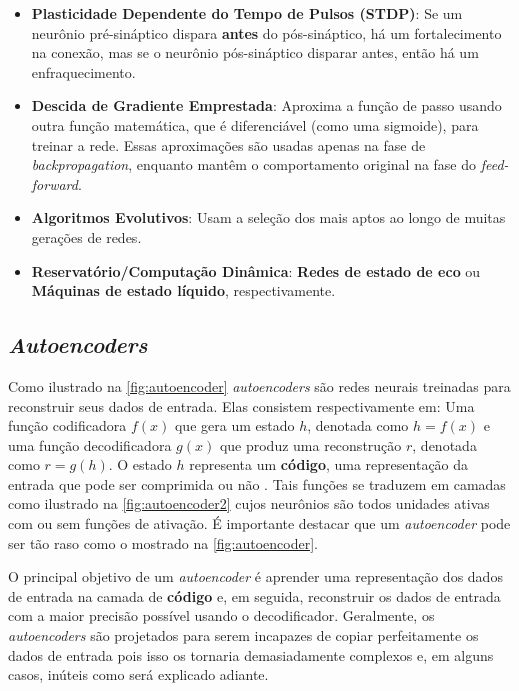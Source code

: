 			\begin{itemize}
				\item \textbf{Plasticidade Dependente do Tempo de Pulsos (STDP)}: Se um neurônio pré-sináptico dispara \textbf{antes} do pós-sináptico, há um fortalecimento na conexão, mas se o neurônio pós-sináptico disparar antes, então há um enfraquecimento.
				\item \textbf{Descida de Gradiente Emprestada}: Aproxima a função de passo usando outra função matemática, que é diferenciável (como uma sigmoide), para treinar a rede. Essas aproximações são usadas apenas na fase de \textit{backpropagation}, enquanto mantêm o comportamento original na fase do \textit{feed-forward}.
				\item \textbf{Algoritmos Evolutivos}: Usam a seleção dos mais aptos ao longo de muitas gerações de redes.
				\item \textbf{Reservatório/Computação Dinâmica}: \textbf{Redes de estado de eco} ou \textbf{Máquinas de estado líquido}, respectivamente.
			\end{itemize}
		
		\subsection{\textit{Autoencoders}}
		
			\par Como ilustrado na  \autoref{fig:autoencoder} \textit{autoencoders} são redes neurais treinadas para reconstruir seus dados de entrada. Elas consistem respectivamente em: Uma função codificadora $f(x)$ que gera um estado $h$, denotada como $h = f(x)$ e uma função decodificadora $g(x)$ que produz uma reconstrução $r$, denotada como $r = g(h)$. O estado $h$ representa um \textbf{código}, uma representação da entrada que pode ser comprimida ou não  \cite{Goodfellow-et-al-2016}. Tais funções se traduzem em camadas como ilustrado na  \autoref{fig:autoencoder2} cujos neurônios são todos unidades ativas com ou sem funções de ativação. É importante destacar que um \textit{autoencoder} pode ser tão raso como o mostrado na \autoref{fig:autoencoder}.
			
			\par O principal objetivo de um \textit{autoencoder} é aprender uma representação dos dados de entrada na camada de \textbf{código} e, em seguida, reconstruir os dados de entrada com a maior precisão possível usando o decodificador. Geralmente, os \textit{autoencoders} são projetados para serem incapazes de copiar perfeitamente os dados de entrada pois isso os tornaria demasiadamente complexos e, em alguns casos, inúteis como será explicado adiante.

